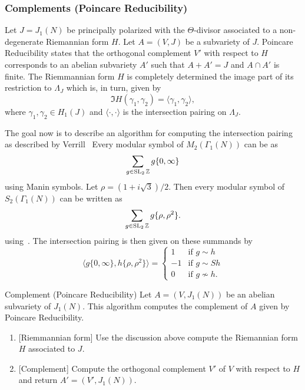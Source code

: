 \documentclass{article}
\begin{document}
\subsubsection{Complements (Poincare Reducibility)}\label{sec:poincare}

Let $J=J_1(N)$ be principally polarized with the $\Theta$-divisor associated to
a non-degenerate Riemannian form $H$. Let $A=(V, J)$ be a subvariety of $J$.
Poincare Reducibility states that the orthogonal complement $V'$ with respect
to $H$ corresponds to an abelian subvariety $A'$ such that $A+A'=J$ and $A\cap
A'$ is finite. The Riemmannian form $H$ is completely determined the image part of
its restriction to $\Lambda_J$ which is, in turn, given by
\[
    \Im H(\gamma_1, \gamma_2) = \langle \gamma_1, \gamma_2 \rangle,
\]
where $\gamma_1, \gamma_2\in H_1(J)$ and $\langle \cdot,\cdot \rangle$ is the
intersection pairing on $\Lambda_J$.

The goal now is to describe an algorithm for computing the intersection pairing
as described by Verrill~\cite[\S 4]{verrill:intersection}
Every modular symbol of $M_2(\Gamma_1(N))$ can be as
\[
    \sum_{g\in \operatorname{SL}_2{\mathbb{Z}}} g\{0, \infty\}
\] 
using Manin symbols. Let $\rho=(1+i\sqrt{3})/2$. Then every modular symbol of
$S_2(\Gamma_1(N))$ can be written as
\[
    \sum_{g\in \operatorname{SL}_2{\mathbb{Z}}} g\{\rho, \rho^2\}.
\]
using~\cite[Corollary 4.1]{verrill:intersection}. The intersection pairing is
then given on these summands by
\[
    \langle g\{0,\infty\}, h\{\rho, \rho^2\} \rangle 
    =
    \begin{cases}
        1 & \text{if } g\sim h \\
        -1 & \text{if } g\sim Sh \\
        0 & \text{if } g\not\sim h.
    \end{cases}
\]

\begin{algorithm}{Complement (Poincare Reducibility)}
    Let $A=(V, J_1(N))$ be an abelian subvariety of $J_1(N)$. This algorithm
    computes the complement of $A$ given by Poincare Reducibility.
    \begin{enumerate}
        \item{} [Riemmannian form]
            Use the discussion above compute the Riemannian form $H$ associated
            to $J$.
        \item{} [Complement]
            Compute the orthogonal complement $V'$ of $V$ with respect to $H$
            and return $A'=(V', J_1(N))$.
    \end{enumerate}
\end{algorithm}
\end{document}
